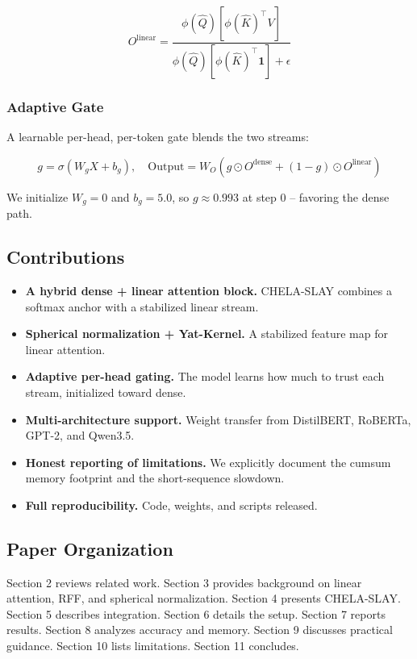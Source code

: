 \[
O^\text{linear} = \frac{\phi(\hat{Q}) \left[ \phi(\hat{K})^\top V \right]}{\phi(\hat{Q}) \left[ \phi(\hat{K})^\top \mathbf{1} \right] + \epsilon}
\]

\subsubsection{Adaptive Gate}

A learnable per-head, per-token gate blends the two streams:

\[
g = \sigma(W_g X + b_g), \quad
\text{Output} = W_O \left( g \odot O^\text{dense} + (1 - g) \odot O^\text{linear} \right)
\]

We initialize $W_g = 0$ and $b_g = 5.0$, so 
$g \approx 0.993$ at step 0 -- favoring the dense path.

\subsection{Contributions}

\begin{itemize}
\item \textbf{A hybrid dense + linear attention block.} CHELA-SLAY combines a
  softmax anchor with a stabilized linear stream.
\item \textbf{Spherical normalization + Yat-Kernel.} A stabilized feature map for
  linear attention.
\item \textbf{Adaptive per-head gating.} The model learns how much to trust each
  stream, initialized toward dense.
\item \textbf{Multi-architecture support.} Weight transfer from DistilBERT, RoBERTa,
  GPT-2, and Qwen3.5.
\item \textbf{Honest reporting of limitations.} We explicitly document the cumsum
  memory footprint and the short-sequence slowdown.
\item \textbf{Full reproducibility.} Code, weights, and scripts released.

\end{itemize}
\subsection{Paper Organization}

Section 2 reviews related work. Section 3 provides background on linear 
attention, RFF, and spherical normalization. Section 4 presents CHELA-SLAY. 
Section 5 describes integration. Section 6 details the setup. Section 7 
reports results. Section 8 analyzes accuracy and memory. Section 9 
discusses practical guidance. Section 10 lists limitations. Section 11 
concludes.



